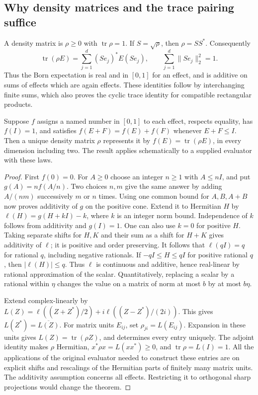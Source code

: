 \subsection{Why density matrices and the trace pairing suffice}

A density matrix is \(\rho\ge0\) with \(\operatorname{tr}\rho=1\).
If \(S=\sqrt\rho\), then \(\rho=SS^*\). Consequently
\[
 \operatorname{tr}(\rho E)=\sum_{j=1}^d (Se_j)^* E(Se_j),\qquad
 \sum_{j=1}^d\|Se_j\|_2^2=1 .
\]
Thus the Born expectation is real and in \([0,1]\) for an effect, and
is additive on sums of effects which are again effects. These identities
follow by interchanging finite sums, which also proves the cyclic trace
identity for compatible rectangular products.

\begin{theorem}\label{thm:q-effect}
Suppose \(f\) assigns a named number in \([0,1]\) to each effect, respects
equality, has \(f(I)=1\), and satisfies
\(f(E+F)=f(E)+f(F)\) whenever \(E+F\le I\). Then a unique density matrix
\(\rho\) represents it by \(f(E)=\operatorname{tr}(\rho E)\), in every
dimension including two. The result applies schematically to a supplied
evaluator with these laws.
\end{theorem}
\begin{proof}
First \(f(0)=0\). For \(A\ge0\) choose an integer \(n\ge1\) with
\(A\le nI\), and put \(g(A)=n f(A/n)\). Two choices \(n,m\) give the
same answer by adding \(A/(nm)\) successively \(m\) or \(n\) times.
Using one common bound for \(A,B,A+B\) now proves additivity of
\(g\) on the positive cone. Extend it to Hermitian \(H\) by
\(\ell(H)=g(H+kI)-k\), where \(k\) is an integer norm bound.
Independence of \(k\) follows from additivity and \(g(I)=1\).
One can also use \(k=0\) for positive \(H\). Taking separate
shifts for \(H,K\) and their sum as a shift for \(H+K\) gives
additivity of \(\ell\); it is positive and order preserving.
It follows that \(\ell(qI)=q\) for rational \(q\), including negative
rationals. If \(-qI\le H\le qI\) for positive rational \(q\), then
\(|\ell(H)|\le q\). Thus \(\ell\) is continuous and additive,
hence real-linear by rational approximation of the scalar. Quantitatively,
replacing a scalar by a rational within \(\eta\) changes the value on
a matrix of norm at most \(b\) by at most \(b\eta\).

Extend complex-linearly by
\(L(Z)=\ell((Z+Z^*)/2)+i\ell((Z-Z^*)/(2i))\).
This gives \(L(Z^*)=\overline{L(Z)}\). For matrix units \(E_{ij}\), set
\(\rho_{ji}=L(E_{ij})\). Expansion in these units gives
\(L(Z)=\operatorname{tr}(\rho Z)\), and determines every entry uniquely.
The adjoint identity makes \(\rho\) Hermitian,
\(x^*\rho x=L(xx^*)\ge0\), and \(\operatorname{tr}\rho=L(I)=1\).
All the applications of the original evaluator needed to construct
these entries are on explicit shifts and rescalings of the Hermitian
parts of finitely many matrix units. The additivity assumption concerns
all effects. Restricting it to orthogonal sharp projections would change
the theorem.
\end{proof}

